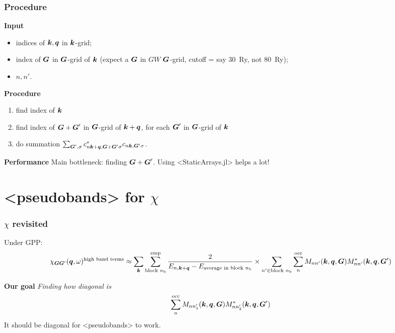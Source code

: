 \documentclass[t]{beamer}
\newcommand{\shortcode}[1]{\texttt{#1}}
\def\\{}%
\def\texttt#1{<#1>}%
\begin{document}
\begin{frame}
\frametitle{Procedure}

\textbf{Input} 
\begin{itemize}
    \item indices of $\vb*{k}, \vb*{q}$ in $\vb*{k}$-grid; 
    \item index of $\vb*{G}$ in $\vb*{G}$-grid of $\vb*{k}$ 
    (expect a $\vb*{G}$ in $GW$ $\vb*{G}$-grid, 
    cutoff = say \SI{30}{Ry}, not \SI{80}{Ry});
    \item $n, n'$.
\end{itemize}

\textbf{Procedure}
\begin{enumerate}
    \item find index of $\vb*{k}$
    \item find index of $\vb*{G} + \vb*{G}'$ in $\vb*{G}$-grid of $\vb*{k} + \vb*{q}$,
    for each $\vb*{G}'$ in $\vb*{G}$-grid of $\vb*{k}$
    \item do summation $\sum_{\vb*{G}', \sigma} c^*_{n \vb*{k} + \vb*{q}, \vb*{G} + \vb*{G}' \sigma} c_{n \vb*{k}, \vb*{G}' \sigma}$.
\end{enumerate}    

\vspace{0.5cm}

\textbf{Performance} Main bottleneck: finding $\vb*{G} + \vb*{G}'$.
Using \shortcode{StaticArrays.jl} helps a lot! 

\end{frame}

\section{\shortcode{pseudobands} for $\chi$}

\begin{frame}
\frametitle{$\chi$ revisited}

Under GPP:
\begin{equation}
    \begin{aligned}
        \chi_{\vb*{G} \vb*{G}'}(\vb*{q}, \omega)^{\text{high band terms}}
        \approx \sum_{\vb*{k}} \sum_{\text{block $n_{\text{b}}$}}^{\text{emp}} 
        \frac{
            2
        }{
            E_{n, \vb*{k} + \vb*{q}} - E_{\text{average in block $n_{\text{b}}$}} 
        } \\
        \times \sum_{n' \in \text{block $n_{\text{b}}$}} \sum_{n}^{\text{occ}} 
        M_{n n'} (\vb*{k}, \vb*{q}, \vb*{G}) M^*_{nn'} (\vb*{k}, \vb*{q}, \vb*{G}') 
    \end{aligned}
\end{equation}

\vspace{0.5cm}

\textbf{Our goal} \emph{Finding how diagonal is}
\begin{equation}
    \sum_{n}^{\text{occ}} 
        M_{n n'_1} (\vb*{k}, \vb*{q}, \vb*{G}) M^*_{nn'_2} (\vb*{k}, \vb*{q}, \vb*{G}') 
\end{equation}
It should be diagonal for \shortcode{pseudobands} to work.

\end{frame}
\end{document}
